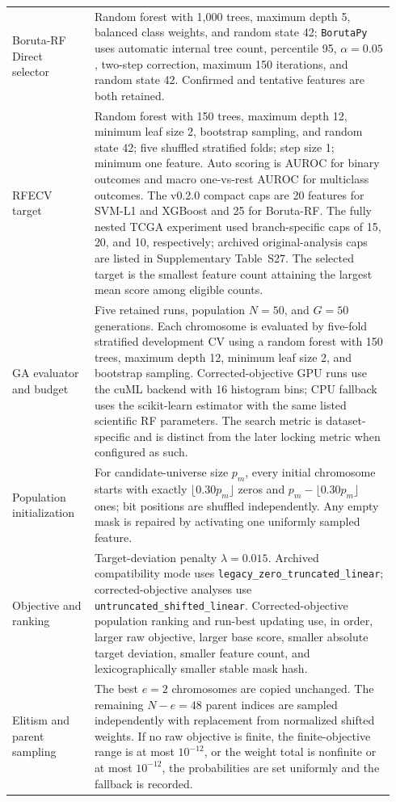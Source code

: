 {\begin{longtable}{@{}>{\raggedright\arraybackslash}p{0.205\linewidth}>{\raggedright\arraybackslash}p{0.735\linewidth}@{}}
Boruta-RF Direct selector & Random forest with 1,000 trees, maximum depth 5, balanced class weights, and random state 42; \texttt{BorutaPy} uses automatic internal tree count, percentile 95, $\alpha=0.05$, two-step correction, maximum 150 iterations, and random state 42. Confirmed and tentative features are both retained. \\
RFECV target & Random forest with 150 trees, maximum depth 12, minimum leaf size 2, bootstrap sampling, and random state 42; five shuffled stratified folds; step size 1; minimum one feature. Auto scoring is AUROC for binary outcomes and macro one-vs-rest AUROC for multiclass outcomes. The v0.2.0 compact caps are 20 features for SVM-L1 and XGBoost and 25 for Boruta-RF. The fully nested TCGA experiment used branch-specific caps of 15, 20, and 10, respectively; archived original-analysis caps are listed in Supplementary Table~S27. The selected target is the smallest feature count attaining the largest mean score among eligible counts. \\
GA evaluator and budget & Five retained runs, population $N=50$, and $G=50$ generations. Each chromosome is evaluated by five-fold stratified development CV using a random forest with 150 trees, maximum depth 12, minimum leaf size 2, and bootstrap sampling. Corrected-objective GPU runs use the cuML backend with 16 histogram bins; CPU fallback uses the scikit-learn estimator with the same listed scientific RF parameters. The search metric is dataset-specific and is distinct from the later locking metric when configured as such. \\
Population initialization & For candidate-universe size $p_m$, every initial chromosome starts with exactly $\lfloor0.30p_m\rfloor$ zeros and $p_m-\lfloor0.30p_m\rfloor$ ones; bit positions are shuffled independently. Any empty mask is repaired by activating one uniformly sampled feature. \\
Objective and ranking & Target-deviation penalty $\lambda=0.015$. Archived compatibility mode uses \texttt{legacy\_zero\_truncated\_linear}; corrected-objective analyses use \texttt{untruncated\_shifted\_linear}. Corrected-objective population ranking and run-best updating use, in order, larger raw objective, larger base score, smaller absolute target deviation, smaller feature count, and lexicographically smaller stable mask hash. \\
Elitism and parent sampling & The best $e=2$ chromosomes are copied unchanged. The remaining $N-e=48$ parent indices are sampled independently with replacement from normalized shifted weights. If no raw objective is finite, the finite-objective range is at most $10^{-12}$, or the weight total is nonfinite or at most $10^{-12}$, the probabilities are set uniformly and the fallback is recorded. \\

\end{longtable}}
